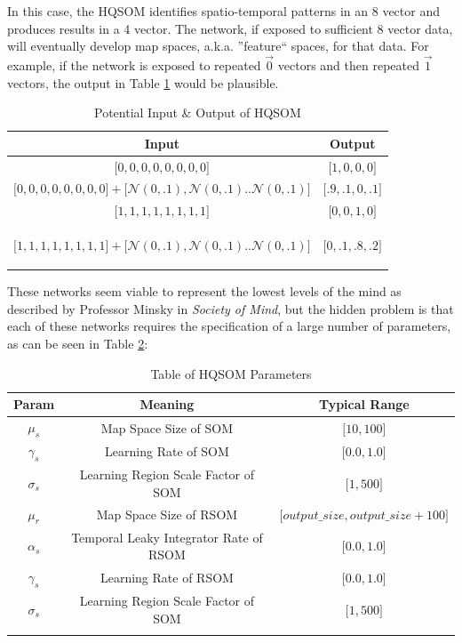\documentclass[12pt,a4paper]{article}
\begin{document}
In this case, the HQSOM identifies spatio-temporal patterns in an 8 vector and produces results in a 4 vector. The network, if exposed to sufficient 8 vector data, will eventually develop map spaces, a.k.a. ''feature`` spaces, for that data. For example, if the network is exposed to repeated $\vec{0}$ vectors and then repeated $\vec{1}$ vectors, the output in Table \ref{table:hqsom} would be plausible.

\begin{table}[H]
\caption{Potential Input \& Output of HQSOM}
\centering
\begin{tabular}{|c|c|}
\hline 
\textbf{Input} & \textbf{Output} \\
\hline 
$\lbrack 0, 0, 0, 0, 0, 0, 0, 0 \rbrack$ & $\lbrack 1, 0, 0, 0 \rbrack$ \\ 
\hline 
$\lbrack 0, 0, 0, 0, 0, 0, 0, 0 \rbrack + \lbrack \mathcal{N}(0, .1), \mathcal{N}(0, .1) .. \mathcal{N}(0, .1) \rbrack $ & $\lbrack .9, .1, 0, .1 \rbrack$ \\ 
\hline 
$\lbrack 1, 1, 1, 1, 1, 1, 1, 1 \rbrack$ & $\lbrack 0, 0, 1, 0 \rbrack$ \\ 
\hline 
$\lbrack 1, 1, 1, 1, 1, 1, 1, 1  \rbrack + \lbrack \mathcal{N}(0, .1), \mathcal{N}(0, .1) .. \mathcal{N}(0, .1) \rbrack $ & $\lbrack 0, .1, .8, .2 \rbrack$
 
\label{table:hqsom}
\end{tabular} 
\end{table}

These networks seem viable to represent the lowest levels of the mind as described by Professor Minsky in \textit{Society of Mind}, but the hidden problem is that each of these networks requires the specification of a large number of parameters, as can be seen in Table \ref{table:params}:
\begin{table}[H]
\caption{Table of HQSOM Parameters}
\centering
\begin{tabular}{|c|c|c|}
\hline 
\textbf{Param} & \textbf{Meaning} &\textbf{Typical Range} \\
\hline
$\mu_s$ & Map Space Size of SOM &  $\lbrack 10, 100 \rbrack$ \\
\hline 
$\gamma_s$ & Learning Rate of SOM &  $\lbrack 0.0, 1.0 \rbrack$ \\
\hline 
$\sigma_s$ & Learning Region Scale Factor of SOM &  $\lbrack 1, 500 \rbrack$ \\
\hline 
$\mu_r$ & Map Space Size of RSOM &  $\lbrack output\_size, output\_size + 100 \rbrack$ \\
\hline 
$\alpha_s$ & Temporal Leaky Integrator Rate of RSOM &  $\lbrack 0.0, 1.0 \rbrack$ \\
\hline 
$\gamma_s$ & Learning Rate of RSOM &  $\lbrack 0.0, 1.0 \rbrack$ \\
\hline 
$\sigma_s$ & Learning Region Scale Factor of SOM &  $\lbrack 1, 500 \rbrack$ \\

\label{table:params}
\end{tabular} 
\end{table}
\end{document}
